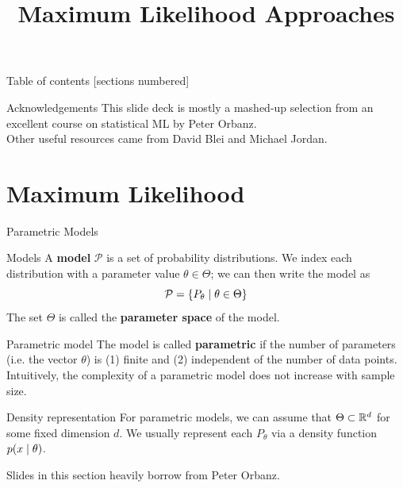 \documentclass[10pt]{beamer}
\title{Maximum Likelihood Approaches}
\renewcommand{\bf}[1]{\textbf{{#1}}}
\begin{document}
\maketitle

\begin{frame}{Table of contents}
  [sections numbered]
  \tableofcontents[hideallsubsections]
\end{frame}

\begin{frame}{Acknowledgements}
This slide deck is mostly a mashed-up selection from an excellent course on statistical ML by Peter Orbanz.  \\
\vfill
Other useful resources came from David Blei and Michael Jordan.
\end{frame}


\section{Maximum Likelihood}

\begin{frame}{Parametric Models}

\begin{sblock}{Models}
A \bf{model} $\mathcal{P}$ is a set of probability distributions.  We index each distribution with a parameter value $\theta \in \Theta$; we can then write the model as
\[ \mathcal{P} = \{ {P_\theta \; | \; \theta \in \Theta} \} \]
The set $\Theta$ is called the \bf{parameter space} of the model.
\end{sblock}

\begin{sblock}{Parametric model}
The model is called \bf{parametric} if the number of parameters (i.e. the vector $\theta$) is (1) finite and (2) independent of the number of data points.   Intuitively, the complexity of a parametric model does not increase with sample size.
\end{sblock}


\begin{sblock}{Density representation}
For parametric models, we can assume that $\Theta \subset \mathbb{R}^d$ for some fixed dimension $d$.   We usually represent each $P_\theta$ via a density function $p(x \; | \; \theta)$.
\end{sblock}
\hfill \tiny Slides in this section heavily borrow from Peter Orbanz.
\end{frame}
\end{document}
